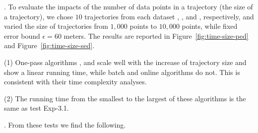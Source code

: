 .
To evaluate the impacts of the number of data points in a trajectory (\ie the size of a trajectory),
we chose $10$ trajectories from each dataset \ucar, \geolife, \mopsi and \act, respectively,
and varied the size  of trajectories from $1,000$ points to $10,000$ points, while fixed error bound $\epsilon = 60$ meters.
The results are reported in Figure~\ref{fig:time-size-ped} and Figure~\ref{fig:time-size-sed}.

\sstab(1) One-pass algorithms \siped, \operb and \cised scale well with the increase of trajectory size  and show a linear running time, while batch and online algorithms do not.
This is consistent with their time complexity analyses.

\sstab(2) The running time from the smallest to the largest of these algorithms is the same as test {Exp-3.1}.




.
From these tests we find the following.

